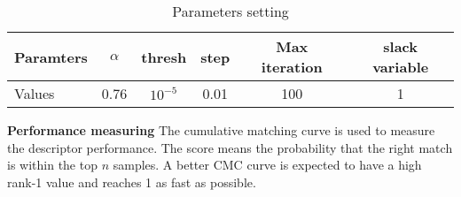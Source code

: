 \begin{table}[H]
\centering
\caption{Parameters setting}
\begin{tabular}{|l|c|c|c|c|c|}
\hline
Paramters &$\alpha$&thresh&step&Max iteration& slack variable\\
\hline
Values &0.76&$10^{-5}$&0.01&100&1\\
\hline
\end{tabular}
\end{table}


\textbf{Performance measuring} The cumulative matching curve is used to measure the descriptor performance. The score means the probability that the right match is within the top $n$ samples. A better CMC curve is expected to have a high rank-1 value and reaches 1 as fast as possible.


